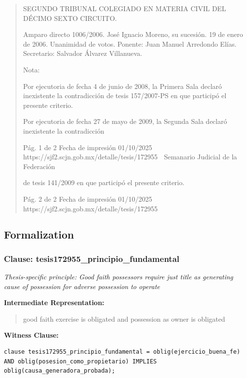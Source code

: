\documentclass[11pt,a4paper]{article}
\begin{document}
\begin{quote}
SEGUNDO TRIBUNAL COLEGIADO EN MATERIA CIVIL DEL DÉCIMO SEXTO CIRCUITO.


Amparo directo 1006/2006. José Ignacio Moreno, su sucesión. 19 de enero de 2006. Unanimidad de
votos. Ponente: Juan Manuel Arredondo Elías. Secretario: Salvador Álvarez Villanueva.

Nota:

Por ejecutoria de fecha 4 de junio de 2008, la Primera Sala declaró inexistente la contradicción de
tesis 157/2007-PS en que participó el presente criterio.

Por ejecutoria de fecha 27 de mayo de 2009, la Segunda Sala declaró inexistente la contradicción


                                             Pág. 1 de 2             Fecha de impresión 01/10/2025
  https://sjf2.scjn.gob.mx/detalle/tesis/172955
                                                  Semanario Judicial de la Federación

de tesis 141/2009 en que participó el presente criterio.




                                              Pág. 2 de 2      Fecha de impresión 01/10/2025
  https://sjf2.scjn.gob.mx/detalle/tesis/172955

\end{quote}

\subsection{Formalization}

\subsubsection{Clause: tesis172955\_principio\_fundamental}

\textit{Thesis-specific principle: Good faith possessors require just title as generating cause of possession for adverse possession to operate}

\textbf{Intermediate Representation:}

\begin{quote}
good faith exercise is obligated and possession as owner is obligated
\end{quote}

\textbf{Witness Clause:}

\begin{lstlisting}[style=witnessstyle, language=Witness]
clause tesis172955_principio_fundamental = oblig(ejercicio_buena_fe) AND oblig(posesion_como_propietario) IMPLIES oblig(causa_generadora_probada);
\end{lstlisting}
\end{document}
